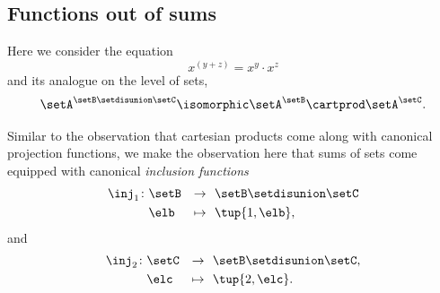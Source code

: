 
\subsection{Functions out of sums}

Here we consider the equation
\begin{equation}
    x^{(y + z)}           = x^y \cdot x^z
\end{equation}
and its analogue on the level of sets,
\begin{equation}
    \setA^{\setB \setdisunion \setC}           \isomorphic \setA^\setB \cartprod \setA^\setC.
\end{equation}

Similar to the observation that cartesian products come along with canonical projection functions, we make the  observation here that sums of sets come equipped with canonical \emph{inclusion functions}
\begin{equation}
    \begin{aligned}
        \inj_1 \colon & \setB & \to     & \ \ \setB \setdisunion \setC \\
                      & \elb  & \mapsto & \ \  \tup{1, \elb},
    \end{aligned}
\end{equation}
and
\begin{equation}
    \begin{aligned}
        \inj_2 \colon & \setC & \to     & \ \ \setB \setdisunion \setC, \\
                      & \elc  & \mapsto & \ \  \tup{2, \elc}.
    \end{aligned}
\end{equation}

